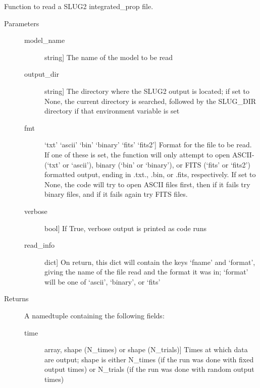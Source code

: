 \documentclass[letterpaper,10pt,english]{sphinxmanual}
\begin{document}

\begin{fulllineitems}
\label{slugpy:slugpy.read_integrated_prop}
Function to read a SLUG2 integrated\_prop file.
\begin{description}
\item[{Parameters}] \leavevmode\begin{description}
\item[{model\_name}] \leavevmode{[}string{]}
The name of the model to be read

\item[{output\_dir}] \leavevmode{[}string{]}
The directory where the SLUG2 output is located; if set to None,
the current directory is searched, followed by the SLUG\_DIR
directory if that environment variable is set

\item[{fmt}] \leavevmode{[}`txt' \textbar{} `ascii' \textbar{} `bin' \textbar{} `binary' \textbar{} `fits' \textbar{} `fits2'{]}
Format for the file to be read. If one of these is set, the
function will only attempt to open ASCII-(`txt' or `ascii'), 
binary (`bin' or `binary'), or FITS (`fits' or `fits2')
formatted output, ending in .txt., .bin, or .fits,
respectively. If set to None, the code will try to open
ASCII files first, then if it fails try binary files, and if
it fails again try FITS files.

\item[{verbose}] \leavevmode{[}bool{]}
If True, verbose output is printed as code runs

\item[{read\_info}] \leavevmode{[}dict{]}
On return, this dict will contain the keys `fname' and
`format', giving the name of the file read and the format it
was in; `format' will be one of `ascii', `binary', or `fits'

\end{description}

\item[{Returns}] \leavevmode
A namedtuple containing the following fields:
\begin{description}
\item[{time}] \leavevmode{[}array, shape (N\_times) or shape (N\_trials){]}
Times at which data are output; shape is either N\_times (if
the run was done with fixed output times) or N\_trials (if
the run was done with random output times)


\end{description}
\end{description}
\end{fulllineitems}
\end{document}

